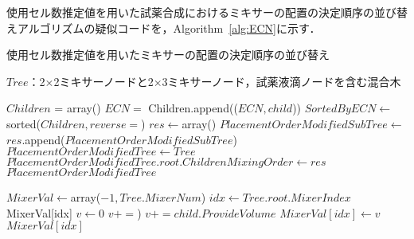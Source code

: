 使用セル数推定値を用いた試薬合成におけるミキサーの配置の決定順序の並び替えアルゴリズムの疑似コードを，Algorithm~\ref{alg:ECN}に示す．
\begin{algorithm}[tbp]
 \caption{使用セル数推定値を用いたミキサーの配置の決定順序の並び替え}\label{alg:ECN}
 \begin{algorithmic}[1]
     \Require $\mathit{Tree}$：2$\times$2ミキサーノードと2$\times$3ミキサーノード，試薬液滴ノードを含む混合木 

        \State $\mathit{Children}$ = array()
            \State $\mathit{ECN}=$ 
            \State Children.append(($\mathit{ECN},child$))
        \EndFor 
        \State $\mathit{SortedByECN} \gets $sorted($Children,reverse=$\True)
        \State $\mathit{res}\gets$array()
            \State $\mathit{PlacementOrderModifiedSubTree}\gets $
            \State $\mathit{res}$.append($\mathit{PlacementOrderModifiedSubTree}$) \EndFor 
        \State $\mathit{PlacementOrderModifiedTree}\gets \mathit{Tree}$ 
        \State $\mathit{PlacementOrderModifiedTree.root.ChildrenMixingOrder}\gets \mathit{res}
        $\Return $\mathit{PlacementOrderModifiedTree}$ 
    \EndFunction 
    
     \State $\mathit{MixerVal}\gets$array($-1,\mathit{Tree.MixerNum}$)
        \Else 
            \State $\mathit{idx}\gets \mathit{Tree.root.MixerIndex}$
            \Return MixerVal[idx]
            \Else 
                \State  $\mathit{v}\gets 0$
                        \State $v+= $)
                    \Else 
                        \State $v+=\mathit{child.ProvideVolume}$
                    \EndIf
                \EndFor 
                \State $\mathit{MixerVal[idx]}\gets v$
                \Return $\mathit{MixerVal[idx]}$
            \EndIf
        \EndIf
    \EndFunction 
 \end{algorithmic}
\end{algorithm}


